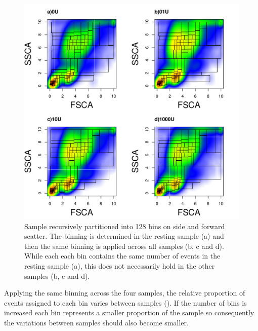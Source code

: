 \begin{figure}[!h]
    \centering
    \includegraphics[scale=.75]{figures/scatter-rpart-128bin-var}
{Sample recursively partitioned into 128 bins on side and forward scatter.}
{
   The binning is determined in the resting sample (a) and then the same binning is applied across all samples (b, c and d).
   While each each bin contains the same number of events in the resting sample (a), this does not necessarily hold in the
   other samples (b, c and d).
}
\end{figure}

Applying the same binning across the four samples, the relative proportion of events assigned to each bin varies between samples ().
If the number of bins is increased each bin represents a smaller proportion of the sample so consequently the variations between samples should also become smaller.

